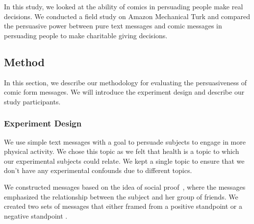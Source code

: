 In this study, we looked at the ability of comics in persuading people make real decisions. We conducted a field study on Amazon Mechanical Turk and compared the persuasive power between pure text messages and comic messages in persuading people to make charitable giving decisions.
\subsection{Method}
\label{sec:Method}

In this section, we describe our methodology for evaluating the persuasiveness of comic form messages. We will introduce the experiment design and describe our study participants.

\subsubsection{Experiment Design}


We use simple text messages with a goal to persuade subjects to engage in more physical activity. We chose this topic as we felt that health is a topic to which our experimental subjects could relate. We kept a single topic to ensure that we don't have any experimental confounds due to different topics.


We constructed messages based on the idea of social proof~\cite{goldstein2008room}, where the messages emphasized the relationship between the subject and her group of friends. We created two sets of messages that either framed from a positive standpoint or a negative standpoint \cite{tversky1981framing}.

